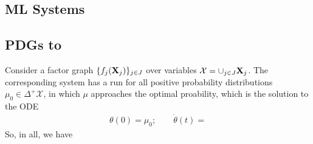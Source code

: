 \documentclass{article}
\begin{document}
    \subsection{ML Systems}
    \subsection{PDGs to }
    
        
    \begin{example}
        Consider a factor graph 
        $\{ f_j(\mathbf{X}_j) \}_{j \in J}$ over variables $\mathcal X = \cup_{j \in J} \mathbf{X}_j$. 
        The corresponding system has a run for all positive probability distributions $\mu_0 \in \Delta^{\!\!{+}\!} \mathcal X$, in which $\mu$ approaches the optimal proability, which is the solution to the ODE
        \begin{align*}
            \theta(0) = \mu_0;
                \qquad
            \dot\theta(t) = 
        \end{align*}
        So, in all, we have
    \end{example}
    
    
    

    
\end{document}

